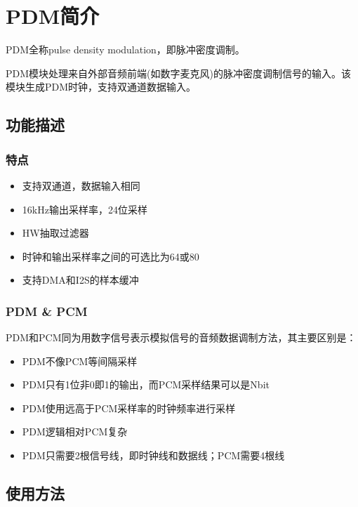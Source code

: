 \documentclass[
  12pt,
]{book}
\begin{document}
\hypertarget{ch-PDM}{%
\chapter{PDM简介}\label{ch-PDM}}

PDM全称pulse density modulation，即脉冲密度调制。

PDM模块处理来自外部音频前端(如数字麦克风)的脉冲密度调制信号的输入。该模块生成PDM时钟，支持双通道数据输入。

\hypertarget{ux529fux80fdux63cfux8ff0-3}{%
\section{功能描述}\label{ux529fux80fdux63cfux8ff0-3}}

\hypertarget{ux7279ux70b9-3}{%
\subsection{特点}\label{ux7279ux70b9-3}}

\begin{itemize}
\item
  支持双通道，数据输入相同
\item
  16kHz输出采样率，24位采样
\item
  HW抽取过滤器
\item
  时钟和输出采样率之间的可选比为64或80
\item
  支持DMA和I2S的样本缓冲
\end{itemize}

\hypertarget{pdm-pcm}{%
\subsection{PDM \& PCM}\label{pdm-pcm}}

PDM和PCM同为用数字信号表示模拟信号的音频数据调制方法，其主要区别是：

\begin{itemize}
\item
  PDM不像PCM等间隔采样
\item
  PDM只有1位非0即1的输出，而PCM采样结果可以是Nbit
\item
  PDM使用远高于PCM采样率的时钟频率进行采样
\item
  PDM逻辑相对PCM复杂
\item
  PDM只需要2根信号线，即时钟线和数据线；PCM需要4根线
\end{itemize}

\hypertarget{ux4f7fux7528ux65b9ux6cd5-3}{%
\section{使用方法}\label{ux4f7fux7528ux65b9ux6cd5-3}}
\end{document}
